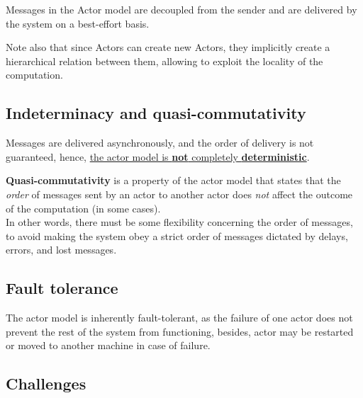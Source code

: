 Messages in the Actor model are decoupled from the sender and are delivered by the system on a best-effort basis.


Note also that since Actors can create new Actors, they implicitly create a hierarchical relation between them, allowing to exploit the locality of the computation.

\subsection{Indeterminacy and quasi-commutativity}
Messages are delivered asynchronously, and the order of delivery is not guaranteed, hence, \ul{the actor model is \textbf{not} completely \textbf{deterministic}}.

\textbf{Quasi-commutativity} is a property of the actor model that states that the \textit{order} of messages sent by an actor to another actor does \textit{not} affect the outcome of the computation (in some cases).\\
In other words, there must be some flexibility concerning the order of messages, to avoid making the system obey a strict order of messages dictated by delays, errors, and lost messages.

\subsection{Fault tolerance}
The actor model is inherently fault-tolerant, as the failure of one actor does not prevent the rest of the system from functioning, besides, actor may be restarted or moved to another machine in case of failure.

\subsection{Challenges}

